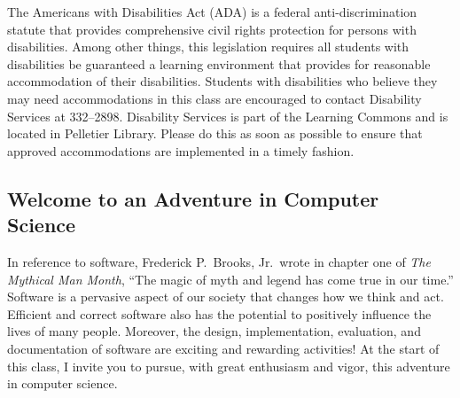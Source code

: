 \documentclass[11pt]{article}
\begin{document}
The Americans with Disabilities Act (ADA) is a federal anti-discrimination statute that provides comprehensive civil
rights protection for persons with disabilities. Among other things, this legislation requires all students with
disabilities be guaranteed a learning environment that provides for reasonable accommodation of their disabilities.
Students with disabilities who believe they may need accommodations in this class are encouraged to contact Disability
Services at 332--2898. Disability Services is part of the Learning Commons and is located in Pelletier Library.
Please do this as soon as possible to ensure that approved accommodations are implemented in a timely fashion.

\subsection*{Welcome to an Adventure in Computer Science}

In reference to software, Frederick P.\ Brooks, Jr.\ wrote in chapter one of {\em The Mythical Man Month}, ``The magic
of myth and legend has come true in our time.'' Software is a pervasive aspect of our society that changes how we think
and act. Efficient and correct software also has the potential to positively influence the lives of many people.
Moreover, the design, implementation, evaluation, and documentation of software are exciting and rewarding activities!
At the start of this class, I invite you to pursue, with great enthusiasm and vigor, this adventure in computer science.
\end{document}

